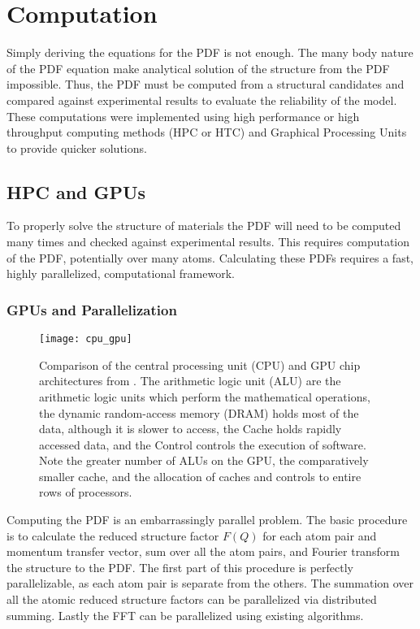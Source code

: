 \section{Computation} \label{sec:comp}
Simply deriving the equations for the PDF is not enough.
The many body nature of the PDF equation make analytical solution of the structure from the PDF impossible.
Thus, the PDF must be computed from a structural candidates and compared against experimental results to evaluate the reliability of the model.
These computations were implemented using high performance or high throughput computing methods (HPC or HTC) and Graphical Processing Units to provide quicker solutions.

\subsection{HPC and GPUs}
To properly solve the structure of materials the PDF will need to be computed many times and checked against experimental results.
This requires computation of the PDF, potentially over many atoms.
Calculating these PDFs requires a fast, highly parallelized, computational framework.
\subsubsection{GPUs and Parallelization}
\begin{figure}
    \texttt{[image: cpu\_gpu]}
    \caption[Comparison of the CPU and GPU chip architectures]{
    Comparison of the central processing unit (CPU) and GPU chip architectures from \cite{Chen2013}.
    The arithmetic logic unit (ALU) are the arithmetic logic units which perform the mathematical operations,
    the dynamic random-access memory (DRAM) holds most of the data, although it is slower to access,
    the Cache holds rapidly accessed data,
    and the Control controls the execution of software.
    Note the greater number of ALUs on the GPU, the comparatively smaller cache,
    and the allocation of caches and controls to entire rows of processors.}
    \label{fig:cpu_vs_gpu}
\end{figure}
Computing the PDF is an embarrassingly parallel problem.
The basic procedure is to calculate the reduced structure factor $F(Q)$ for each atom pair and momentum transfer vector, sum over all the atom pairs, and Fourier transform the structure to the PDF.
The first part of this procedure is perfectly parallelizable, as each atom pair is separate from the others.
The summation over all the atomic reduced structure factors can be parallelized via distributed summing.
Lastly the FFT can be parallelized using existing algorithms.

